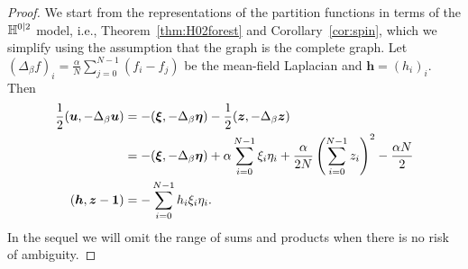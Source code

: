 \documentclass[11pt]{amsart}
\numberwithin{equation}{section}
\numberwithin{theorem}{section}
\newcommand{\V}[1]{\boldsymbol{#1}}
\begin{document}
\begin{proof}
  We start from the representations of the partition functions in
  terms of the $\mathbb{H}^{0|2}$ model, i.e., Theorem~\ref{thm:H02forest}
  and Corollary~\ref{cor:spin}, which we simplify using the assumption
  that the graph is the complete graph.  Let
  $(\Delta_\beta f)_i = \frac{\alpha}{N}\sum_{j=0}^{N-1} (f_i-f_j)$ be
  the mean-field Laplacian and $\V{h}= (h_i)_i$.  Then
\begin{align}
  \frac12 (\V{u},-\Delta_\beta \V{u})
  &= - (\V{\xi},-\Delta_\beta \V{\eta}) - \frac12 (\V{z},-\Delta_\beta \V{z})
  \nnb
  &= - (\V{\xi},-\Delta_\beta \V{\eta}) + \alpha \sum_{i=0}^{N-1} \xi_i\eta_i + \frac{\alpha}{2N} \pa{\sum_{i=0}^{N-1} z_i}^2 - \frac{\alpha N}{2}
  \\
  (\V{h}, \V{z}-\V{1}) &= - \sum_{i=0}^{N-1} h_i\xi_i\eta_i
                         .
\end{align}
In the sequel we will omit the range of sums and products when
there is no risk of ambiguity.


\end{proof}
\end{document}
